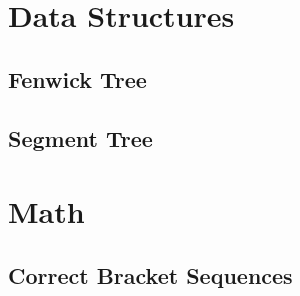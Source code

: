 \documentclass[12pt]{article}
\begin{document}
%
% 
%
% 


\section{Data Structures}
\subsection{Fenwick Tree}


\subsection{Segment Tree}


\section{Math}
\subsection{Correct Bracket Sequences}

\end{document}
